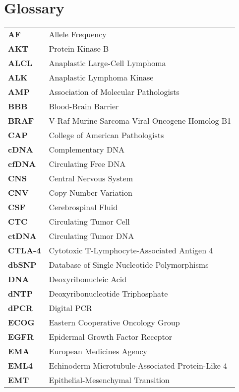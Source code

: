 \chapter*{Glossary}

\footnotesize
\begin{longtable}[l]{l l}
    \textbf{AF} & Allele Frequency \\
    \textbf{AKT} & Protein Kinase B \\ 
    \textbf{ALCL} & Anaplastic Large-Cell Lymphoma \\
    \textbf{ALK} & Anaplastic Lymphoma Kinase \\
    \textbf{AMP} & Association of Molecular Pathologists \\
    \textbf{BBB} & Blood-Brain Barrier \\
    \textbf{BRAF} & V-Raf Murine Sarcoma Viral Oncogene Homolog B1 \\
    \textbf{CAP} & College of American Pathologists \\
    \textbf{cDNA} & Complementary DNA \\
    \textbf{cfDNA} & Circulating Free DNA \\
    \textbf{CNS} & Central Nervous System \\
    \textbf{CNV} & Copy-Number Variation \\
    \textbf{CSF} & Cerebrospinal Fluid \\
    \textbf{CTC} & Circulating Tumor Cell \\
    \textbf{ctDNA} & Circulating Tumor DNA \\
    \textbf{CTLA-4} & Cytotoxic T-Lymphocyte-Associated Antigen 4 \\
    \textbf{dbSNP} & Database of Single Nucleotide Polymorphisms \\
    \textbf{DNA} & Deoxyribonucleic Acid \\
    \textbf{dNTP} & Deoxyribonucleotide Triphosphate \\
    \textbf{dPCR} & Digital PCR \\
    \textbf{ECOG} & Eastern Cooperative Oncology Group \\
    \textbf{EGFR} & Epidermal Growth Factor Receptor \\
    \textbf{EMA} & European Medicines Agency \\
    \textbf{EML4} & Echinoderm Microtubule-Associated Protein-Like 4 \\
    \textbf{EMT} & Epithelial-Mesenchymal Transition \\

\end{longtable}
